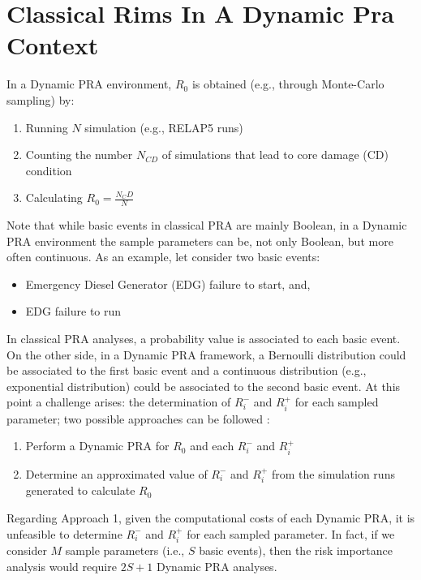\section{Classical Rims In A Dynamic Pra Context}
\label{sec:classicalRIMs_RISMC}

In a Dynamic PRA environment, $R_0$ is obtained (e.g., through Monte-Carlo sampling) by:
\begin{enumerate}
  \item Running $N$ simulation (e.g., RELAP5 runs)
  \item Counting the number $N_{CD}$ of simulations that lead to core damage (CD) condition
  \item Calculating $R_0= \frac{N_CD}{N}$
\end{enumerate}
Note that while basic events in classical PRA are mainly Boolean, in a Dynamic PRA environment the 
sample parameters can be, not only Boolean, but more often continuous. As an example, let consider
two basic events:
\begin{itemize}
  \item Emergency Diesel Generator (EDG) failure to start, and, 
  \item EDG failure to run
\end{itemize}

In classical PRA analyses, a probability value is associated to each basic event. On the other side, 
in a Dynamic PRA framework, a Bernoulli distribution could be associated to the first basic event and 
a continuous distribution (e.g., exponential distribution) could be associated to the second basic event. 
At this point a challenge arises: the determination of $R_i^-$ and $R_i^+$ for each sampled parameter; 
two possible approaches can be followed :
\begin{enumerate}
  \item Perform a Dynamic PRA for $R_0$ and each $R_i^-$ and $R_i^+$
  \item Determine an approximated value of $R_i^-$ and $R_i^+$ from the simulation runs generated to calculate $R_0$
\end{enumerate}
Regarding Approach 1, given the computational costs of each Dynamic PRA, it is unfeasible to determine 
$R_i^-$ and $R_i^+$ for each sampled parameter. In fact, if we consider $M$ sample
parameters (i.e., $S$ basic events), then the risk importance analysis would require $2S+1$ Dynamic PRA analyses.


